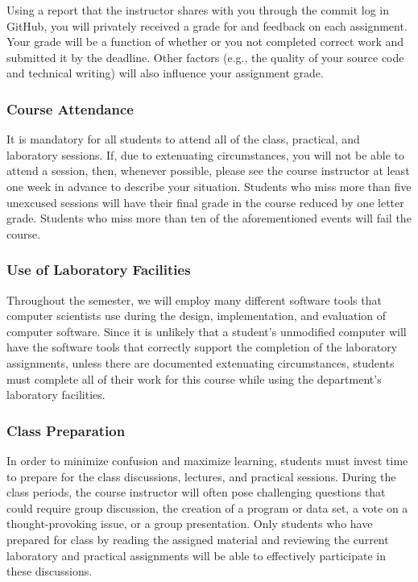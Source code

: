 \documentclass[11pt]{article}
\begin{document}
Using a report that the instructor shares with you through the commit log in GitHub, you will privately received a grade
for and feedback on each assignment. Your grade will be a function of whether or you not completed correct work and
submitted it by the deadline. Other factors (e.g., the quality of your source code and technical writing) will also
influence your assignment grade.

\subsubsection*{Course Attendance}

It is mandatory for all students to attend all of the class, practical, and laboratory sessions. If, due to extenuating
circumstances, you will not be able to attend a session, then, whenever possible, please see the course instructor at
least one week in advance to describe your situation. Students who miss more than five unexcused sessions will have
their final grade in the course reduced by one letter grade. Students who miss more than ten of the aforementioned
events will fail the course.

\subsubsection*{Use of Laboratory Facilities}

Throughout the semester, we will employ many different software tools that computer scientists use during the design,
implementation, and evaluation of computer software. Since it is unlikely that a student's unmodified computer will have
the software tools that correctly support the completion of the laboratory assignments, unless there are documented
extenuating circumstances, students must complete all of their work for this course while using the department's
laboratory facilities.

\subsubsection*{Class Preparation}

In order to minimize confusion and maximize learning, students must invest time to prepare for the class discussions,
lectures, and practical sessions. During the class periods, the course instructor will often pose challenging questions
that could require group discussion, the creation of a program or data set, a vote on a thought-provoking issue, or a
group presentation. Only students who have prepared for class by reading the assigned material and reviewing the
current laboratory and practical assignments will be able to effectively participate in these discussions.
\end{document}
